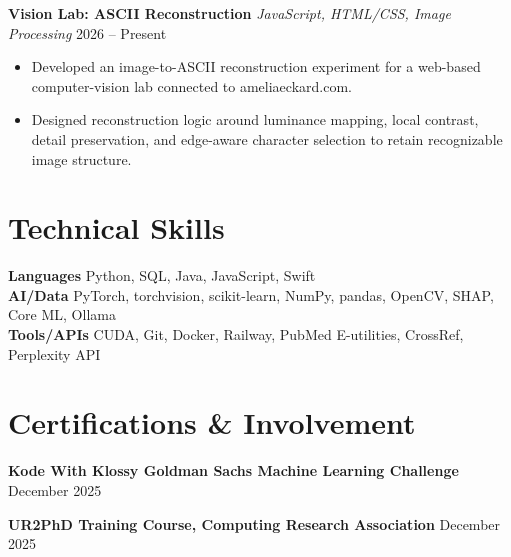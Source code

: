 \documentclass[letterpaper,10pt]{article}
\newcommand{\projectentry}[3]{
  \noindent\textbf{#1} \textbar{} \textit{#2} \hfill #3
}
\newcommand{\activityentry}[2]{
  \noindent\textbf{#1} \hfill #2
}
\begin{document}
\smallskip

\projectentry
  {Vision Lab: ASCII Reconstruction}
  {JavaScript, HTML/CSS, Image Processing}
  {2026 -- Present}
\begin{itemize}
  \item Developed an image-to-ASCII reconstruction experiment for a web-based computer-vision lab connected to ameliaeckard.com.
  \item Designed reconstruction logic around luminance mapping, local contrast, detail preservation, and edge-aware character selection to retain recognizable image structure.
\end{itemize}

\section{Technical Skills}

\noindent\textbf{Languages} \quad Python, SQL, Java, JavaScript, Swift \\[1pt]
\noindent\textbf{AI/Data} \quad PyTorch, torchvision, scikit-learn, NumPy, pandas, OpenCV, SHAP, Core ML, Ollama \\[1pt]
\noindent\textbf{Tools/APIs} \quad CUDA, Git, Docker, Railway, PubMed E-utilities, CrossRef, Perplexity API

\section{Certifications \& Involvement}

\activityentry
  {Kode With Klossy \texttimes{} Goldman Sachs Machine Learning Challenge}{December 2025}

\smallskip

\activityentry
  {UR2PhD Training Course, Computing Research Association}{December 2025}
\end{document}
